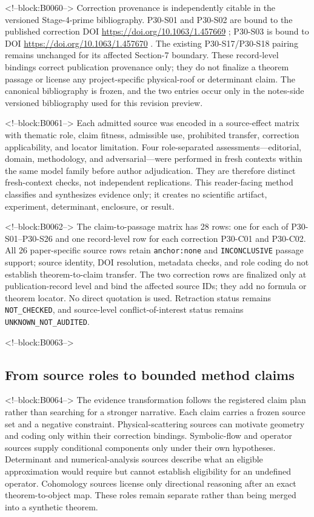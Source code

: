\documentclass[11pt,a4paper]{article}
\begin{document}
<!--block:B0060-->
Correction provenance is independently citable in the versioned Stage-4-prime
bibliography.  P30-S01 and P30-S02 are bound to the published correction
DOI \url{https://doi.org/10.1063/1.457669} \citep{P30-C01}; P30-S03 is bound
to DOI \url{https://doi.org/10.1063/1.457670} \citep{P30-C02}.  The existing
P30-S17/P30-S18 pairing remains unchanged for its affected Section-7 boundary.
These record-level bindings correct publication provenance only; they do not
finalize a theorem passage or license any project-specific physical-roof or
determinant claim.  The canonical bibliography is frozen, and the two entries
occur only in the notes-side versioned bibliography used for this revision preview.

<!--block:B0061-->
Each admitted source was encoded in a source-effect matrix with thematic role,
claim fitness, admissible use, prohibited transfer, correction applicability,
and locator limitation.  Four role-separated assessments---editorial, domain,
methodology, and adversarial---were performed in fresh contexts within the same
model family before author adjudication.  They are therefore distinct
fresh-context checks, not independent replications.  This reader-facing method
classifies and synthesizes evidence only; it creates no scientific artifact,
experiment, determinant, enclosure, or result.

<!--block:B0062-->
The claim-to-passage matrix has 28 rows: one for each of P30-S01--P30-S26 and
one record-level row for each correction P30-C01 and P30-C02.  All 26
paper-specific source rows retain \texttt{anchor:none} and
\texttt{INCONCLUSIVE} passage support; source identity, DOI resolution, metadata
checks, and role coding do not establish theorem-to-claim transfer.  The two
correction rows are finalized only at publication-record level and bind the
affected source IDs; they add no formula or theorem locator.  No direct quotation
is used.  Retraction status remains \texttt{NOT\_\allowbreak CHECKED}, and source-level
conflict-of-interest status remains \texttt{UNKNOWN\_\allowbreak NOT\_\allowbreak AUDITED}.

<!--block:B0063-->
\subsection{From source roles to bounded method claims}

<!--block:B0064-->
The evidence transformation follows the registered claim plan rather than
searching for a stronger narrative.  Each claim carries a frozen source set
and a negative constraint.  Physical-scattering sources can motivate geometry
and coding only within their correction bindings.  Symbolic-flow and operator
sources supply conditional components only under their own hypotheses.
Determinant and numerical-analysis sources describe what an eligible
approximation would require but cannot establish eligibility for an undefined
operator.  Cohomology sources license only directional reasoning after an exact
theorem-to-object map.  These roles remain separate rather than being merged
into a synthetic theorem.
\end{document}
